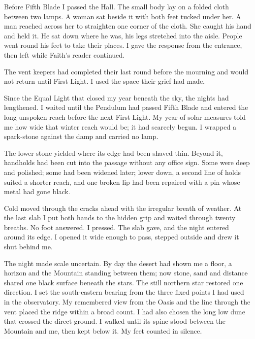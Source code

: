 Before Fifth Blade I passed the Hall. The small body lay on a folded cloth between two lamps. A woman sat beside it with both feet tucked under her. A man reached across her to straighten one corner of the cloth. She caught his hand and held it. He sat down where he was, his legs stretched into the aisle. People went round his feet to take their places. I gave the response from the entrance, then left while Faith's reader continued.\par

The vent keepers had completed their last round before the mourning and would not return until First Light. I used the space their grief had made.\par

Since the Equal Light that closed my year beneath the sky, the nights had lengthened. I waited until the Pendulum had passed Fifth Blade and entered the long unspoken reach before the next First Light. My year of solar measures told me how wide that winter reach would be; it had scarcely begun. I wrapped a spark-stone against the damp and carried no lamp.\par

The lower stone yielded where its edge had been shaved thin. Beyond it, handholds had been cut into the passage without any office sign. Some were deep and polished; some had been widened later; lower down, a second line of holds suited a shorter reach, and one broken lip had been repaired with a pin whose metal had gone black.\par

Cold moved through the cracks ahead with the irregular breath of weather. At the last slab I put both hands to the hidden grip and waited through twenty breaths. No foot answered. I pressed. The slab gave, and the night entered around its edge. I opened it wide enough to pass, stepped outside and drew it shut behind me.\par

The night made scale uncertain. By day the desert had shown me a floor, a horizon and the Mountain standing between them; now stone, sand and distance shared one black surface beneath the stars. The still northern star restored one direction. I set the south-eastern bearing from the three fixed points I had used in the observatory. My remembered view from the Oasis and the line through the vent placed the ridge within a broad count. I had also chosen the long low dune that crossed the direct ground. I walked until its spine stood between the Mountain and me, then kept below it. My feet counted in silence.\par

